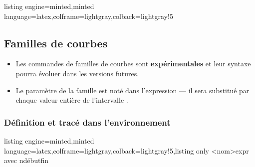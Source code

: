\documentclass[11pt,a4paper]{ltxdoc}
\begin{document}
\begin{tcblisting}{listing engine=minted,minted language=latex,colframe=lightgray,colback=lightgray!5}
\begin{GraphiqueTikz}[x=1.5cm,y=1.5cm,Xmin=-1,Xmax=4,Ymin=-3,Ymax=3]
\end{GraphiqueTikz}
\end{tcblisting}

\pagebreak

\subsection{Familles de courbes}\label{famcourbes}

\begin{itemize}
  \item Les commandes de familles de courbes sont \textbf{expérimentales}
  et leur syntaxe pourra évoluer dans les versions futures.
  \item Le paramètre de la famille est noté  dans
  l'expression — il sera substitué par chaque valeur entière de
  l'intervalle .
\end{itemize}

\subsubsection{Définition et tracé dans l'environnement}

\begin{tcblisting}{listing engine=minted,minted language=latex,colframe=lightgray,colback=lightgray!5,listing only}
\DefinirFamilleCourbes[clés]<nom>{expr avec n}{début}{fin}
\end{tcblisting}
\end{document}
